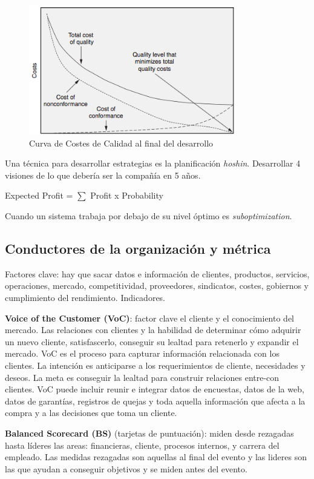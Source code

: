 \documentclass[]{article}
\begin{document}
\begin{figure}[ht!]
	\centering
	\includegraphics[width=90mm]{imagenes/CurvaCostesCalidadFin.png}
	\caption{Curva de Costes de Calidad al final del desarrollo}
	\label{fig:CurvaCostesdeCalidadFin}
\end{figure}

Una técnica para desarrollar estrategias es la planificación \textit{hoshin}. Desarrollar 4 visiones de lo que debería ser la compañía en 5 años.

Expected Profit = $\sum$ Profit x Probability

Cuando un sistema trabaja por debajo de su nivel óptimo es \textit{suboptimization}.

\subsection{Conductores de la organización y métrica}
Factores clave: hay que sacar datos e información de clientes, productos, servicios, operaciones, mercado, competitividad, proveedores, sindicatos, costes, gobiernos y cumplimiento del rendimiento. Indicadores.

\textbf{Voice of the Customer (VoC)}: factor clave el cliente y el conocimiento del mercado. Las relaciones con clientes y la habilidad de determinar cómo adquirir un nuevo cliente, satisfascerlo, conseguir su lealtad para retenerlo y expandir el mercado. VoC es el proceso para capturar información relacionada con los clientes. La intención es anticiparse a los requerimientos de cliente, necesidades y deseos. La meta es conseguir la lealtad para construir relaciones entre-con clientes. VoC puede incluir reunir e integrar datos de encuestas, datos de la web, datos de garantías, registros de quejas y toda aquella información que afecta a la compra y a las decisiones que toma un cliente.

\textbf{Balanced Scorecard (BS)} (tarjetas de puntuación): miden desde rezagadas hasta líderes las areas: financieras, cliente, procesos internos, y carrera del empleado. Las medidas rezagadas son aquellas al final del evento y las lideres son las que ayudan a conseguir objetivos y se miden antes del evento. 
\end{document}
